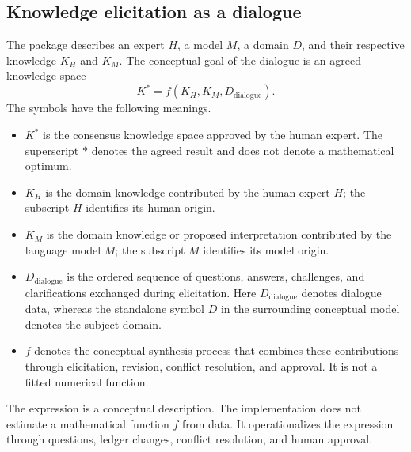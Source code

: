 \documentclass[12pt,a4paper]{article}
\newcommand{\K}{K^{*}}
\begin{document}
\subsection{Knowledge elicitation as a dialogue}
The package describes an expert $H$, a model $M$, a domain $D$, and their respective knowledge $K_H$ and $K_M$. The conceptual goal of the dialogue is an agreed knowledge space
\begin{equation}
 \K=f(K_H,K_M,D_{\mathrm{dialogue}}).
\end{equation}
The symbols have the following meanings.
\begin{itemize}
\item $\K$ is the consensus knowledge space approved by the human expert. The superscript $*$ denotes the agreed result and does not denote a mathematical optimum.
\item $K_H$ is the domain knowledge contributed by the human expert $H$; the subscript $H$ identifies its human origin.
\item $K_M$ is the domain knowledge or proposed interpretation contributed by the language model $M$; the subscript $M$ identifies its model origin.
\item $D_{\mathrm{dialogue}}$ is the ordered sequence of questions, answers, challenges, and clarifications exchanged during elicitation. Here $D_{\mathrm{dialogue}}$ denotes dialogue data, whereas the standalone symbol $D$ in the surrounding conceptual model denotes the subject domain.
\item $f$ denotes the conceptual synthesis process that combines these contributions through elicitation, revision, conflict resolution, and approval. It is not a fitted numerical function.
\end{itemize}
The expression is a conceptual description. The implementation does not estimate a mathematical function $f$ from data. It operationalizes the expression through questions, ledger changes, conflict resolution, and human approval.
\end{document}
